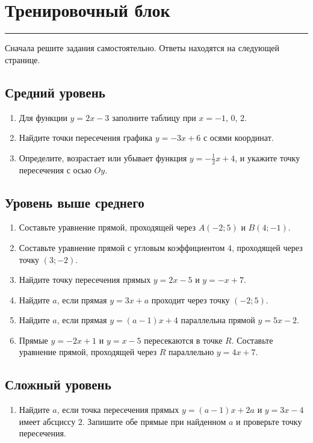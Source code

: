 \documentclass[a4paper,12pt]{article}
\newcommand{\sectionline}{\par\vspace{2pt}\textcolor{accent}{\rule{\linewidth}{0.8pt}}\vspace{5pt}}
\begin{document}
\clearpage
\section*{Тренировочный блок}
\sectionline

\textcolor{softgray}{Сначала решите задания самостоятельно. Ответы находятся на следующей странице.}

\subsection*{Средний уровень}
\begin{enumerate}
  \item Для функции $y=2x-3$ заполните таблицу при $x=-1$, $0$, $2$.
  \item Найдите точки пересечения графика $y=-3x+6$ с осями координат.
  \item Определите, возрастает или убывает функция $y=-\frac12x+4$, и укажите точку пересечения с осью $Oy$.
\end{enumerate}

\subsection*{Уровень выше среднего}
\begin{enumerate}[resume]
  \item Составьте уравнение прямой, проходящей через $A(-2;5)$ и $B(4;-1)$.
  \item Составьте уравнение прямой с угловым коэффициентом $4$, проходящей через точку $(3;-2)$.
  \item Найдите точку пересечения прямых $y=2x-5$ и $y=-x+7$.
  \item Найдите $a$, если прямая $y=3x+a$ проходит через точку $(-2;5)$.
  \item Найдите $a$, если прямая $y=(a-1)x+4$ параллельна прямой $y=5x-2$.
  \item Прямые $y=-2x+1$ и $y=x-5$ пересекаются в точке $R$. Составьте уравнение прямой, проходящей через $R$ параллельно $y=4x+7$.
\end{enumerate}

\subsection*{Сложный уровень}
\begin{enumerate}[resume]
  \item Найдите $a$, если точка пересечения прямых
  $y=(a-1)x+2a$ и $y=3x-4$ имеет абсциссу $2$. Запишите обе прямые при найденном $a$ и проверьте точку пересечения.
\end{enumerate}
\end{document}
